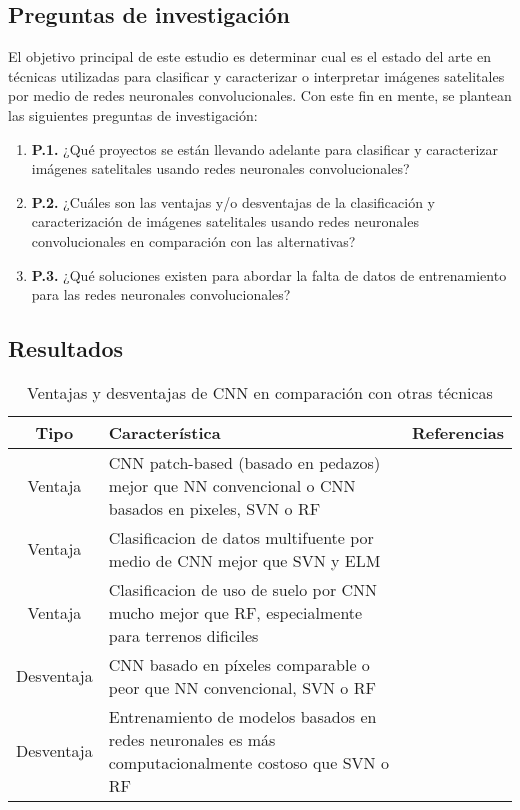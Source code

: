 \subsection{Preguntas de investigación}

El objetivo principal de este estudio es determinar cual es el estado del arte en técnicas utilizadas para clasificar y
caracterizar o interpretar imágenes satelitales por medio de redes neuronales convolucionales. Con este fin en mente,
se plantean las siguientes preguntas de investigación:

\begin{enumerate}
    \item[] {\bf P.1.} ¿Qué proyectos se están llevando adelante para clasificar y caracterizar imágenes satelitales
        usando redes neuronales convolucionales?
    \item[] {\bf P.2.} ¿Cuáles son las ventajas y/o desventajas de la clasificación y caracterización de imágenes
        satelitales usando redes neuronales convolucionales en comparación con las alternativas?
    \item[] {\bf P.3.} ¿Qué soluciones existen para abordar la falta de datos de entrenamiento para las redes
        neuronales convolucionales?
\end{enumerate}

\subsection{Resultados}


\begin{center}
    \begin{table}[h]
        \begin{tabular}{ |c|m{11cm}|c| }
            \hline
            \bf Tipo & \bf Característica & \bf Referencias \\
            \hline
            Ventaja & CNN patch-based (basado en pedazos) mejor que NN convencional o CNN basados en pixeles, SVN o RF & \autocite{sharma-2017} \\
            \hline
            Ventaja & Clasificacion de datos multifuente por medio de CNN mejor que SVN y ELM & \autocite{xu-2017} \\
            \hline
            Ventaja & Clasificacion de uso de suelo por CNN mucho mejor que RF, especialmente para terrenos dificiles & \autocite{rezaee-2018} \\
            \hline
            Desventaja & CNN basado en píxeles comparable o peor que NN convencional, SVN o RF & \autocite{sharma-2017} \\
            \hline
            Desventaja & Entrenamiento de modelos basados en redes neuronales es más computacionalmente costoso que SVN o RF & \autocite{sharma-2017,xu-2017,rezaee-2018} \\
            \hline
        \end{tabular}
        \caption{Ventajas y desventajas de CNN en comparación con otras técnicas}
        \label{table:1}
    \end{table}
\end{center}

